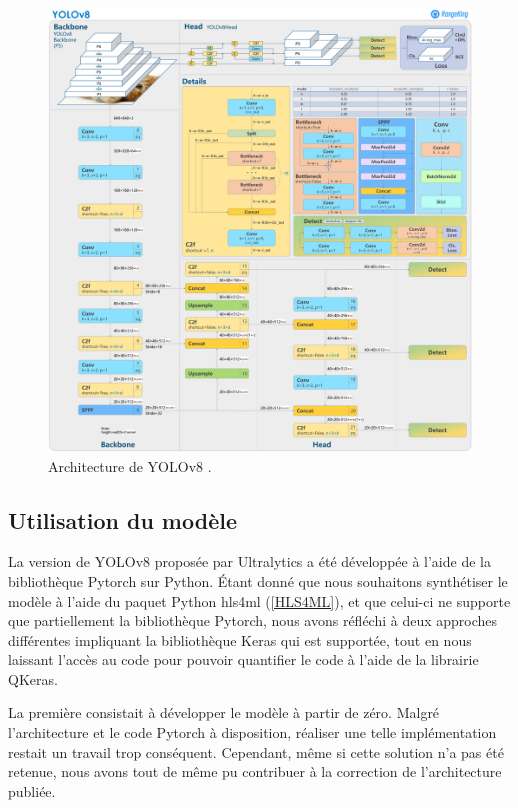 \begin{figure}[hbt!]
    \centering
    \includegraphics[scale=0.17]{Figures/yolov8_architecture.jpg}
    \caption{Architecture de YOLOv8 \cite{noauthor_brief_nodate}.}
    \label{fig:yolov8_architecture}
\end{figure}

\subsection{Utilisation du modèle}
\label{subsec:yolov8_utilization}

La version de YOLOv8 proposée par Ultralytics a été développée à l'aide de la bibliothèque Pytorch sur Python. Étant donné que nous souhaitons synthétiser le modèle à l'aide du paquet Python \acrshort{hls4ml} (\ref{HLS4ML}), et que celui-ci ne supporte que partiellement la bibliothèque Pytorch, nous avons réfléchi à deux approches différentes impliquant la bibliothèque Keras qui est supportée, tout en nous laissant l'accès au code pour pouvoir quantifier le code à l'aide de la librairie QKeras.

La première consistait à développer le modèle à partir de zéro. Malgré l'architecture et le code Pytorch à disposition, réaliser une telle implémentation restait un travail trop conséquent. Cependant, même si cette solution n'a pas été retenue, nous avons tout de même pu contribuer à la correction de l'architecture publiée.\\


